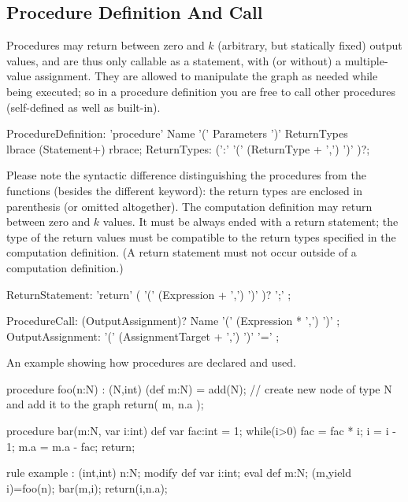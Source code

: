 \subsection{Procedure Definition And Call}\label{sub:procedures}\label{sec:proccall} 

Procedures may return between zero and $k$ (arbitrary, but statically fixed) output values, and are thus only callable as a statement, with (or without) a multiple-value assignment.
They are allowed to manipulate the graph as needed while being executed;
so in a procedure definition you are free to call other procedures (self-defined as well as built-in).

\begin{rail} 
  ProcedureDefinition: 
	'procedure' Name '(' Parameters ')' ReturnTypes \\
	lbrace (Statement+) rbrace;
  ReturnTypes: (':' '(' (ReturnType + ',') ')' )?;
\end{rail}

Please note the syntactic difference distinguishing the procedures from the functions (besides the different keyword): the return types are enclosed in parenthesis (or omitted altogether).
The computation definition may return between zero and $k$ values.
It must be always ended with a return statement; the type of the return values must be compatible to the return types specified in the computation definition.
(A return statement must not occur outside of a computation definition.)

\begin{rail}
  ReturnStatement: 'return' ( '(' (Expression + ',') ')' )? ';' ;
\end{rail}

\begin{rail}
  ProcedureCall: (OutputAssignment)? Name '(' (Expression * ',') ')' ;
  OutputAssignment: '(' (AssignmentTarget + ',') ')' '=' ;
\end{rail}

\begin{example}
An example showing how procedures are declared and used.
  \begin{grgen}
procedure foo(n:N) : (N,int)
{
	(def m:N) = add(N); // create new node of type N and add it to the graph
	return( m, n.a );
}

procedure bar(m:N, var i:int)
{
	def var fac:int = 1;
	while(i>0) {
		fac = fac * i;
		i = i - 1;
	}
	m.a = m.a - fac;
	return;
}

rule example : (int,int)
{
	n:N;
	modify {
		def var i:int;
		eval {
			def m:N;
			(m,yield i)=foo(n);
			bar(m,i);
		}
		return(i,n.a);
	}
}
  \end{grgen}
\end{example}

